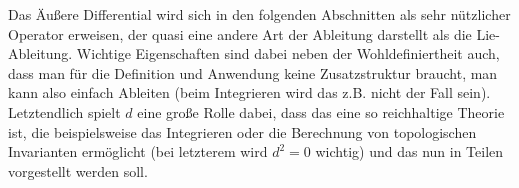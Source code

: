 \documentclass[../H_Analysis_main.tex]{subfiles}
\begin{document}
Das Äußere Differential wird sich in den folgenden Abschnitten als sehr nützlicher Operator erweisen, der quasi eine andere Art der Ableitung darstellt als die Lie-Ableitung. Wichtige Eigenschaften sind dabei neben der Wohldefiniertheit auch, dass man für die Definition und Anwendung keine Zusatzstruktur braucht, man kann also einfach Ableiten (beim Integrieren wird das z.B. nicht der Fall sein). Letztendlich spielt $d$ eine große Rolle dabei, dass das  eine so reichhaltige Theorie ist, die beispielsweise das Integrieren oder die Berechnung von topologischen Invarianten ermöglicht (bei letzterem wird $d^2 = 0$ wichtig) und das nun in Teilen vorgestellt werden soll.



\newpage
\end{document}
